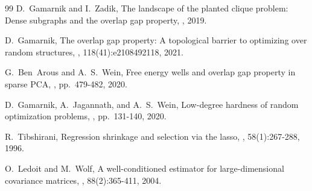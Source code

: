 \documentclass[11pt]{article}
\begin{document}
\begin{thebibliography}{99}
D.~Gamarnik and I.~Zadik,
\newblock The landscape of the planted clique problem: Dense subgraphs and the overlap gap property,
, 2019.

D.~Gamarnik,
\newblock The overlap gap property: A topological barrier to optimizing over random structures,
, 118(41):e2108492118, 2021.

G.~Ben~Arous and A.~S.~Wein,
\newblock Free energy wells and overlap gap property in sparse PCA,
, pp.~479-482, 2020.

D.~Gamarnik, A.~Jagannath, and A.~S.~Wein,
\newblock Low-degree hardness of random optimization problems,
, pp.~131-140, 2020.

R.~Tibshirani,
\newblock Regression shrinkage and selection via the lasso,
, 58(1):267-288, 1996.

O.~Ledoit and M.~Wolf,
\newblock A well-conditioned estimator for large-dimensional covariance matrices,
, 88(2):365-411, 2004.

\end{thebibliography}
\end{document}
